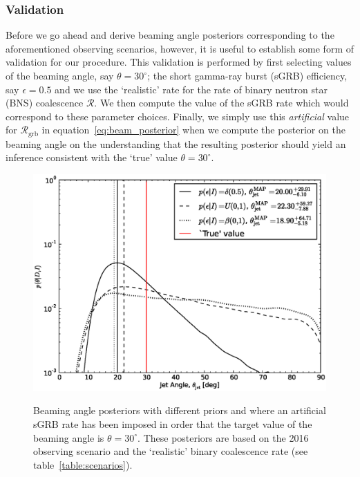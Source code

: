 \documentclass[twocolumn,nofootinbib]{revtex4-1}
\newcommand{\grbrate}{{{\mathcal R}_{\mathrm{grb}}}}
\newcommand{\cbcrate}{{{\mathcal R}}}
\def\bns#1{binary neutron star#1 (BNS#1)\gdef\bns{BNS}}
\def\sgrb#1{short gamma-ray burst#1 (sGRB#1)\gdef\sgrb{sGRB}}
\begin{document}
\subsubsection{Validation}
Before we go ahead and derive beaming angle posteriors corresponding to the
aforementioned observing scenarios, however, it is useful to establish some form
of validation for our procedure.  This validation is performed by first
selecting values of the beaming angle, say $\theta=30^{\circ}$; the \sgrb{}
efficiency, say $\epsilon=0.5$ and we use the `realistic' rate for the rate of
\bns{} coalescence $\cbcrate$.  We then compute the value of the \sgrb{} rate
which would correspond to these parameter choices.  Finally, we simply use this
\emph{artificial} value for $\grbrate$ in equation~\ref{eq:beam_posterior} when
we compute the posterior on the beaming angle on the understanding that the
resulting posterior should yield an inference consistent with the `true' value
$\theta=30^{\circ}$.
%
\begin{figure}
\centering
{\includegraphics[width=\linewidth]{jet_angle_posterior_aligo_2016.eps}}
\caption{Beaming angle posteriors with different priors and where an artificial \sgrb{}
    rate has been imposed in order that the target value of the beaming angle is
$\theta = 30^{\circ}$.  These posteriors are based on the 2016 observing
scenario and the `realistic' binary coalescence rate (see
table~\ref{table:scenarios}). \label{fig:injjetposterio2016}}
\end{figure}
%
\end{document}
